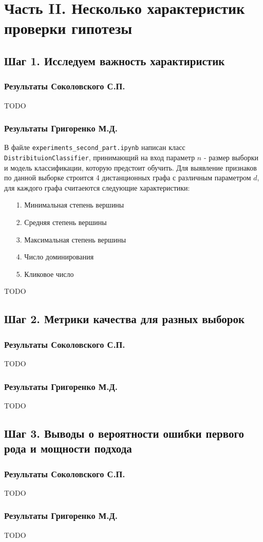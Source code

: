 \documentclass[a4paper,12pt]{article}
\begin{document}
\section{Часть II. Несколько характеристик проверки гипотезы}
\subsection{Шаг 1. Исследуем важность характиристик}
\subsubsection*{Результаты Соколовского С.П.}
TODO

\subsubsection*{Результаты Григоренко М.Д.}
В файле \texttt{experiments\_second\_part.ipynb} написан класс \texttt{DistribituionClassifier}, принимающий на вход параметр $n$ - размер выборки и модель классификации, которую предстоит обучить. Для выявление признаков по данной выборке строится 4 дистанционных графа с различным параметром $d$, для каждого графа считаеются следующие характеристики:
\begin{itemize}
    \item[1.] Минимальная степень вершины
    \item[2.] Средняя степень вершины
    \item[3.] Максимальная степень вершины
    \item[4.] Число доминирования
    \item[5.] Кликовое число
\end{itemize}
TODO

\subsection{Шаг 2. Метрики качества для разных выборок}
\subsubsection*{Результаты Соколовского С.П.}
TODO

\subsubsection*{Результаты Григоренко М.Д.}
TODO

\subsection{Шаг 3. Выводы о вероятности ошибки первого рода и мощности подхода}
\subsubsection*{Результаты Соколовского С.П.}
TODO

\subsubsection*{Результаты Григоренко М.Д.}
TODO
\end{document}
